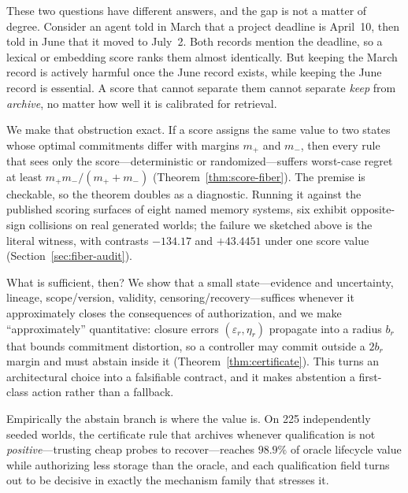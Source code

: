 \documentclass{article}
\begin{document}
\label{sec:intro-witness}
These two questions have different answers, and the gap is not a matter of
degree. Consider an agent told in March that a project deadline is April~10,
then told in June that it moved to July~2. Both records mention the deadline, so
a lexical or embedding score ranks them almost identically. But keeping the
March record is actively harmful once the June record exists, while keeping the
June record is essential. A score that cannot separate them cannot separate
\emph{keep} from \emph{archive}, no matter how well it is calibrated for
retrieval.

We make that obstruction exact. If a score assigns the same value to two states
whose optimal commitments differ with margins $m_+$ and $m_-$, then every rule
that sees only the score---deterministic or randomized---suffers worst-case
regret at least $m_+m_-/(m_++m_-)$ (Theorem~\ref{thm:score-fiber}). The premise
is checkable, so the theorem doubles as a diagnostic. Running it against the
published scoring surfaces of eight named memory systems, six exhibit
opposite-sign collisions on real generated worlds; the failure we sketched above
is the literal witness, with contrasts $-134.17$ and $+43.4451$ under one score
value (Section~\ref{sec:fiber-audit}).

What is sufficient, then? We show that a small state---evidence and
uncertainty, lineage, scope/version, validity, censoring/recovery---suffices
whenever it approximately closes the consequences of authorization, and we make
``approximately'' quantitative: closure errors $(\varepsilon_r,\eta_r)$
propagate into a radius $b_r$ that bounds commitment distortion, so a
controller may commit outside a $2b_r$ margin and must abstain inside it
(Theorem~\ref{thm:certificate}). This turns an architectural choice into a
falsifiable contract, and it makes abstention a first-class action rather than
a fallback.

Empirically the abstain branch is where the value is. On 225 independently seeded
worlds, the certificate rule that archives whenever qualification is not
\emph{positive}---trusting cheap probes to recover---reaches $98.9\%$ of oracle
lifecycle value while authorizing less storage than the oracle, and each
qualification field turns out to be decisive in exactly the mechanism family that
stresses it.
\end{document}

